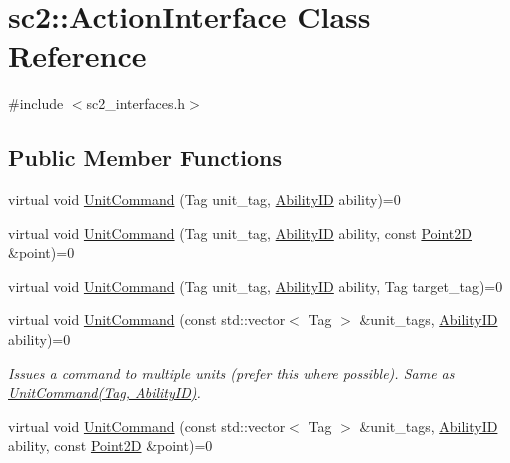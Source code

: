 \hypertarget{classsc2_1_1_action_interface}{}\section{sc2\+:\+:Action\+Interface Class Reference}
\label{classsc2_1_1_action_interface}


{\ttfamily \#include $<$sc2\+\_\+interfaces.\+h$>$}

\subsection*{Public Member Functions}
\begin{DoxyCompactItemize}
\item 
virtual void \hyperlink{classsc2_1_1_action_interface_ad401d286fabc349133f27e0fc29099f2}{Unit\+Command} (Tag unit\+\_\+tag, \hyperlink{classsc2_1_1_s_c2_type}{Ability\+ID} ability)=0
\item 
virtual void \hyperlink{classsc2_1_1_action_interface_a89d51301c22e6c28672be771a3db47e2}{Unit\+Command} (Tag unit\+\_\+tag, \hyperlink{classsc2_1_1_s_c2_type}{Ability\+ID} ability, const \hyperlink{structsc2_1_1_point2_d}{Point2D} \&point)=0
\item 
virtual void \hyperlink{classsc2_1_1_action_interface_a5aacde49d90f8d6637ff0b69891448c4}{Unit\+Command} (Tag unit\+\_\+tag, \hyperlink{classsc2_1_1_s_c2_type}{Ability\+ID} ability, Tag target\+\_\+tag)=0
\item 
\mbox{\label{classsc2_1_1_action_interface_a23192496f856ac368d17da913cd97eac}} 
virtual void \hyperlink{classsc2_1_1_action_interface_a23192496f856ac368d17da913cd97eac}{Unit\+Command} (const std\+::vector$<$ Tag $>$ \&unit\+\_\+tags, \hyperlink{classsc2_1_1_s_c2_type}{Ability\+ID} ability)=0
\begin{DoxyCompactList}\small\item\em Issues a command to multiple units (prefer this where possible). Same as \hyperlink{classsc2_1_1_action_interface_ad401d286fabc349133f27e0fc29099f2}{Unit\+Command(\+Tag, Ability\+I\+D)}. \end{DoxyCompactList}\item 
\mbox{\label{classsc2_1_1_action_interface_a9c68a84725771092f731061797c0de5d}} 
virtual void \hyperlink{classsc2_1_1_action_interface_a9c68a84725771092f731061797c0de5d}{Unit\+Command} (const std\+::vector$<$ Tag $>$ \&unit\+\_\+tags, \hyperlink{classsc2_1_1_s_c2_type}{Ability\+ID} ability, const \hyperlink{structsc2_1_1_point2_d}{Point2D} \&point)=0

\end{DoxyCompactItemize}
